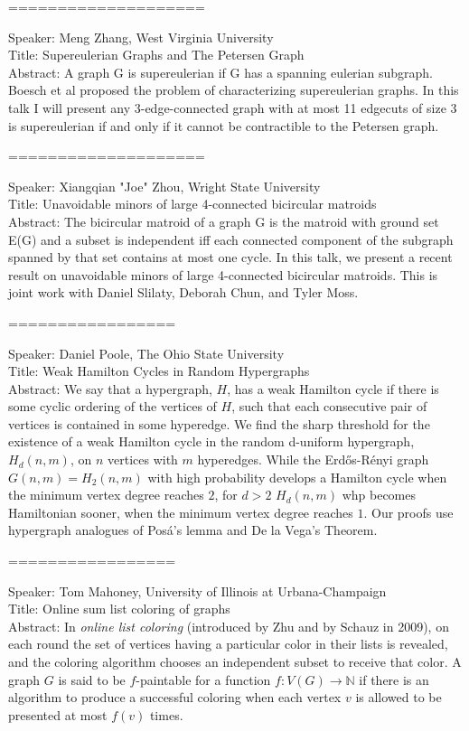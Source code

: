 \documentclass[11pt]{article}
\begin{document}
====================


Speaker: Meng Zhang, West Virginia University\\
Title: Supereulerian Graphs and The Petersen Graph \\
Abstract:  A graph G is supereulerian if G has a spanning eulerian subgraph.
Boesch et al proposed the problem of characterizing supereulerian graphs. In
this talk I will present any 3-edge-connected graph with at most 11 edgecuts
of size 3 is supereulerian if and only if it cannot be contractible to the
Petersen graph. 

====================


Speaker: Xiangqian "Joe" Zhou, Wright State University\\
Title: Unavoidable minors of large 4-connected bicircular matroids \\
Abstract:  The bicircular matroid of a graph G is the matroid with ground
set E(G) and a subset is independent iff each connected component of the
subgraph spanned by that set contains at most one cycle.   In this talk, we
present a recent result on unavoidable minors of large 4-connected
bicircular matroids. This is joint work with Daniel Slilaty, Deborah Chun,
and Tyler Moss.  


=================

Speaker: Daniel Poole, The Ohio State University\\
Title: Weak Hamilton Cycles in Random Hypergraphs\\
Abstract: We say that a hypergraph, $H$, has a weak Hamilton cycle if there is some
cyclic ordering of the vertices of $H$, such that each consecutive pair of
vertices is contained in some hyperedge. We find the sharp threshold for the
existence of a weak Hamilton cycle in the random d-uniform hypergraph,
$H_d(n,m)$, on $n$ vertices with $m$ hyperedges. While the
Erd\H{o}s-R\'{e}nyi graph $G(n,m)=H_2(n,m)$ with high probability develops a
Hamilton cycle when the minimum vertex degree reaches $2$, for $d>2$
$H_d(n,m)$ whp becomes Hamiltonian sooner, when the minimum vertex degree
reaches $1$. Our proofs use hypergraph analogues of Pos\'{a}'s lemma and De
la Vega's Theorem. 

=================


Speaker: Tom Mahoney, University of Illinois at Urbana-Champaign\\
Title: Online sum list coloring of graphs\\
Abstract: In \textit{online list coloring} (introduced by Zhu and by Schauz in 2009), on each round the set of vertices having a particular color in their lists is revealed, and the coloring algorithm chooses an independent subset to receive that color. A graph $G$ is said to be $f$-paintable for a function $f: V(G) \to \mathbb{N}$ if there is an algorithm to produce a successful coloring when each vertex $v$ is allowed to be presented at most $f(v)$ times.
\end{document}
